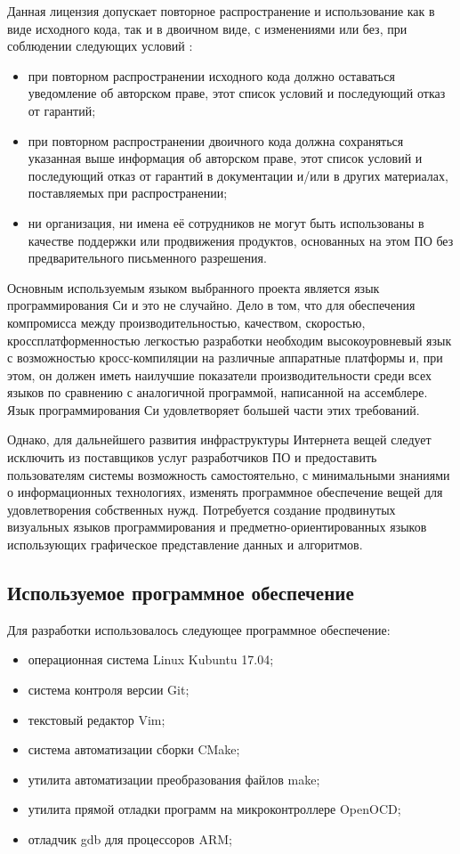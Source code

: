 Данная лицензия допускает повторное распространение и использование как в виде 
исходного кода, так и в двоичном виде, с изменениями или без, при соблюдении 
следующих условий \cite{BSDLicense}:

\begin{itemize}
 \item при повторном распространении исходного кода должно оставаться 
уведомление об авторском праве, этот список условий и последующий отказ от 
гарантий;
 \item при повторном распространении двоичного кода должна сохраняться 
указанная 
выше информация об авторском праве, этот список условий и последующий отказ от 
гарантий в документации и/или в других материалах, поставляемых при 
распространении;
 \item ни организация, ни имена её сотрудников не могут быть использованы в 
качестве поддержки или продвижения продуктов, основанных на этом ПО без 
предварительного письменного разрешения.
\end{itemize}

Основным используемым языком выбранного проекта является язык программирования 
Си и это не случайно.
Дело в том, что для обеспечения компромисса между производительностью, 
качеством, скоростью, кроссплатформенностью легкостью разработки необходим 
высокоуровневый язык с возможностью кросс-компиляции на различные аппаратные 
платформы и, при этом, он должен иметь наилучшие показатели производительности 
среди всех языков по сравнению с аналогичной программой, написанной на 
ассемблере.
Язык программирования Си удовлетворяет большей части этих требований. 

Однако, для дальнейшего развития инфраструктуры Интернета вещей следует 
исключить из поставщиков услуг разработчиков ПО и предоставить пользователям 
системы возможность самостоятельно, с минимальными знаниями о информационных 
технологиях, изменять программное обеспечение вещей для удовлетворения 
собственных нужд.
Потребуется создание продвинутых визуальных языков программирования и 
предметно-ориентированных языков использующих графическое
представление данных и алгоритмов. 

\subsection{Используемое программное обеспечение}

Для разработки использовалось следующее программное обеспечение:
\begin{itemize}
 \item операционная система Linux Kubuntu 17.04;
 \item система контроля версии Git;
 \item текстовый редактор Vim;
 \item система автоматизации сборки CMake;
 \item утилита автоматизации преобразования файлов make;
 \item утилита прямой отладки программ на микроконтроллере OpenOCD;
 \item отладчик gdb для процессоров ARM;
\end{itemize}



